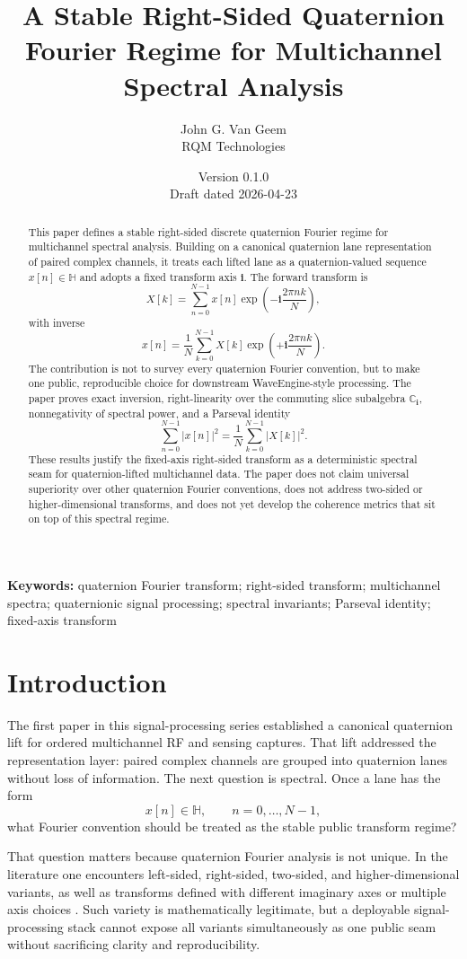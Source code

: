 \documentclass[11pt]{article}
\title{\textbf{A Stable Right-Sided Quaternion Fourier Regime for Multichannel Spectral Analysis}}
\author{John G. Van Geem\\
RQM Technologies}
\date{Version 0.1.0 \\ Draft dated 2026-04-23}
\theoremstyle{remark}
\newcommand{\C}{\mathbb{C}}
\newcommand{\HH}{\mathbb{H}}
\newcommand{\ii}{\mathbf{i}}
\newcommand{\abs}[1]{\left\lvert #1 \right\rvert}
\begin{document}
\maketitle

\begin{abstract}
This paper defines a stable right-sided discrete quaternion Fourier regime for multichannel spectral analysis. Building on a canonical quaternion lane representation of paired complex channels, it treats each lifted lane as a quaternion-valued sequence \(x[n]\in\HH\) and adopts a fixed transform axis \(\ii\). The forward transform is
\[
X[k]=\sum_{n=0}^{N-1} x[n]\exp\!\left(-\ii\frac{2\pi nk}{N}\right),
\]
with inverse
\[
x[n]=\frac{1}{N}\sum_{k=0}^{N-1} X[k]\exp\!\left(+\ii\frac{2\pi nk}{N}\right).
\]
The contribution is not to survey every quaternion Fourier convention, but to make one public, reproducible choice for downstream WaveEngine-style processing. The paper proves exact inversion, right-linearity over the commuting slice subalgebra \(\C_{\ii}\), nonnegativity of spectral power, and a Parseval identity
\[
\sum_{n=0}^{N-1} \abs{x[n]}^2=\frac{1}{N}\sum_{k=0}^{N-1}\abs{X[k]}^2.
\]
These results justify the fixed-axis right-sided transform as a deterministic spectral seam for quaternion-lifted multichannel data. The paper does not claim universal superiority over other quaternion Fourier conventions, does not address two-sided or higher-dimensional transforms, and does not yet develop the coherence metrics that sit on top of this spectral regime.
\end{abstract}

\noindent\textbf{Keywords:} quaternion Fourier transform; right-sided transform; multichannel spectra; quaternionic signal processing; spectral invariants; Parseval identity; fixed-axis transform

\section{Introduction}

The first paper in this signal-processing series established a canonical quaternion lift for ordered multichannel RF and sensing captures. That lift addressed the representation layer: paired complex channels are grouped into quaternion lanes without loss of information. The next question is spectral. Once a lane has the form
\[
x[n]\in\HH,\qquad n=0,\dots,N-1,
\]
what Fourier convention should be treated as the stable public transform regime?

That question matters because quaternion Fourier analysis is not unique. In the literature one encounters left-sided, right-sided, two-sided, and higher-dimensional variants, as well as transforms defined with different imaginary axes or multiple axis choices \citep{ell2007}. Such variety is mathematically legitimate, but a deployable signal-processing stack cannot expose all variants simultaneously as one public seam without sacrificing clarity and reproducibility.
\end{document}

